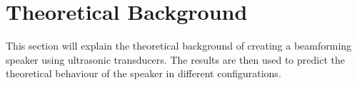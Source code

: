 \chapter{Theoretical Background}
%
This section will explain the theoretical background of creating a beamforming speaker using ultrasonic transducers. The results are then used to predict the theoretical behaviour of the speaker in different configurations.
%

